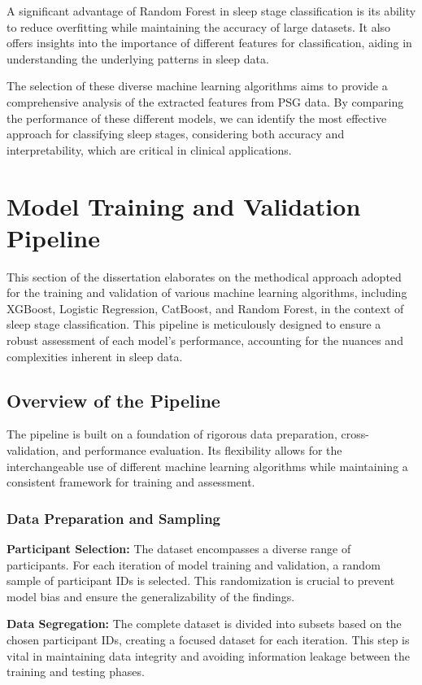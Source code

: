 \documentclass[12pt, a4paper,oneside]{book}
\numberwithin{equation}{section}
\begin{document}
A significant advantage of Random Forest in sleep stage classification is its ability to reduce overfitting while maintaining the accuracy of large datasets. It also offers insights into the importance of different features for classification, aiding in understanding the underlying patterns in sleep data.\cite{Breiman2001}

\newline\newline
The selection of these diverse machine learning algorithms aims to provide a comprehensive analysis of the extracted features from PSG data. By comparing the performance of these different models, we can identify the most effective approach for classifying sleep stages, considering both accuracy and interpretability, which are critical in clinical applications.

\section{Model Training and Validation Pipeline}
This section of the dissertation elaborates on the methodical approach adopted for the training and validation of various machine learning algorithms, including XGBoost, Logistic Regression, CatBoost, and Random Forest, in the context of sleep stage classification. This pipeline is meticulously designed to ensure a robust assessment of each model's performance, accounting for the nuances and complexities inherent in sleep data.
\subsection{Overview of the Pipeline}
The pipeline is built on a foundation of rigorous data preparation, cross-validation, and performance evaluation. Its flexibility allows for the interchangeable use of different machine learning algorithms while maintaining a consistent framework for training and assessment.
\subsubsection{Data Preparation and Sampling}
\textbf{Participant Selection:} The dataset encompasses a diverse range of participants. For each iteration of model training and validation, a random sample of participant IDs is selected. This randomization is crucial to prevent model bias and ensure the generalizability of the findings.

\textbf{Data Segregation:} The complete dataset is divided into subsets based on the chosen participant IDs, creating a focused dataset for each iteration. This step is vital in maintaining data integrity and avoiding information leakage between the training and testing phases.
\end{document}
